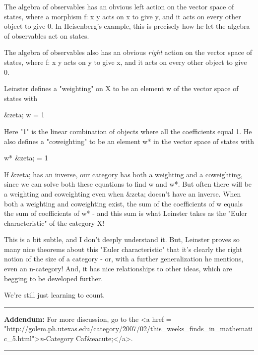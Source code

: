 The algebra of observables has an obvious left action on the vector 
space of states, where a morphism f: x \to  y acts on x to give y, and 
it acts on every other object to give 0.  In Heisenberg's example, 
this is precisely how he let the algebra of observables act on states.

The algebra of observables also has an obvious \emph{right} action
on the vector space of states, where f: x \to  y acts on y to give
x, and it acts on every other object to give 0.

Leinster defines a "weighting" on X to be an element w of
the vector space of states with

&zeta; w = 1

Here "1" is the linear combination of objects where all the
coefficients equal 1.  He also defines a "coweighting" to be
an element w* in the vector space of states with

w* &zeta; = 1

If &zeta; has an inverse, our category has both a weighting and a
coweighting, since we can solve both these equations to find w and w*.
But often there will be a weighting and coweighting even when &zeta;
doesn't have an inverse.  When both a weighting and coweighting exist,
the sum of the coefficients of w equals the sum of coefficients of w*
- and this sum is what Leinster takes as the "Euler
characteristic" of the category X!

This is a bit subtle, and I don't deeply understand it.  But, Leinster
proves so many nice theorems about this "Euler characteristic" that 
it's clearly the right notion of the size of a category - or, with a
further generalization he mentions, even an n-category!  And, it has 
nice relationships to other ideas, which are begging to be developed
further.

We're still just learning to count.

\par\noindent\rule{\textwidth}{0.4pt}
\textbf{Addendum:} For more discussion, go to the <a href = "http://golem.ph.utexas.edu/category/2007/02/this_weeks_finds_in_mathematic_5.html">\emph{n}-Category
Caf&eacute;</a>.





\par\noindent\rule{\textwidth}{0.4pt}
